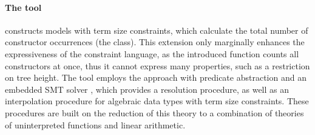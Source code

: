 \paragraph{The \eldarica{} tool~\cite{8603013}} constructs models with term size constraints, which calculate the total number of constructor occurrences (the \sizeelemclass{} class). This extension only marginally enhances the expressiveness of the constraint language, as the introduced function counts all constructors at once, thus it cannot express many properties, such as a restriction on tree height. The \eldarica{} tool employs the \cegar{} approach with predicate abstraction and an embedded SMT solver \princess{}\cite{princess}, which provides a resolution procedure, as well as an interpolation procedure for algebraic data types with term size constraints. These procedures are built on the reduction of this theory to a combination of theories of uninterpreted functions and linear arithmetic\cite{hojjat2017deciding}.

